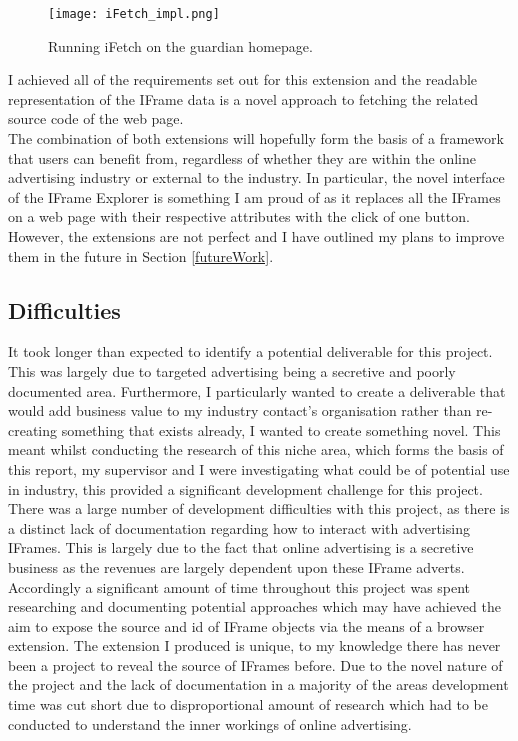 \documentclass[12pt]{article}
\begin{document}
\begin{figure}[H]
    \centering
    \texttt{[image: iFetch\_impl.png]}
    \caption{Running iFetch on the guardian homepage.}
    \label{fig:iFetch_impl}
\end{figure}

I achieved all of the requirements set out for this extension and the readable representation of the IFrame data is a novel approach to fetching the related source code of the web page. \\

The combination of both extensions will hopefully form the basis of a framework that users can benefit from, regardless of whether they are within the online advertising industry or external to the industry. In particular, the novel interface of the IFrame Explorer is something I am proud of as it replaces all the IFrames on a web page with their respective attributes with the click of one button. However, the extensions are not perfect and I have outlined my plans to improve them in the future in Section \ref{futureWork}.  

\subsection{Difficulties} \label{diff}
It took longer than expected to identify a potential deliverable for this project. This was largely  due to targeted advertising being a secretive and poorly documented area. Furthermore, I particularly wanted to create a deliverable that would add business value to my industry contact's organisation rather than re-creating something that exists already, I wanted to create something novel. This meant whilst conducting the research of this niche area, which forms the basis of this report, my supervisor and I were investigating  what could be of potential use in industry, this provided a significant development challenge for this project. \\

There was a large number of development difficulties with this project, as there is a distinct lack of documentation regarding how to interact with advertising IFrames. This is largely due to the fact that online advertising is a secretive business as the revenues are largely dependent upon these IFrame adverts. Accordingly a significant amount of time throughout this project was spent researching and documenting potential approaches which may have achieved the aim to expose the source and id of IFrame objects via the means of a browser extension. The extension I produced is unique, to my knowledge there has never been a project to reveal the source of IFrames before. Due to the novel nature of the project and the lack of documentation in a majority of the areas development time was cut short due to disproportional amount of research which had to be conducted to understand the inner workings of online advertising. \\
\end{document}
